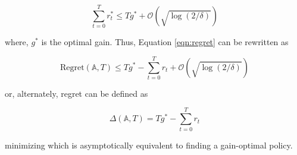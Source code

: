 \begin{equation*}
    \sum_{t = 0}^T r^*_t \le T g^* + \mathcal{O}(\sqrt{\log(2/\delta)}) 
\end{equation*}

where, $g^*$ is the optimal gain. Thus, Equation \ref{eqn:regret} can be rewritten as

\begin{equation*}
    \text{Regret}(\mathbb{A}, T) \le T g^* - \sum_{t = 0}^T r_t + \mathcal{O}(\sqrt{\log(2/\delta)})
\end{equation*}

or, alternately, regret can be defined as

\begin{equation}
    \label{eqn:theogregret}
    \Delta(\mathbb{A}, T) =  T g^* - \sum_{t = 0}^T r_t
\end{equation}

minimizing which is asymptotically equivalent to finding a gain-optimal policy.


